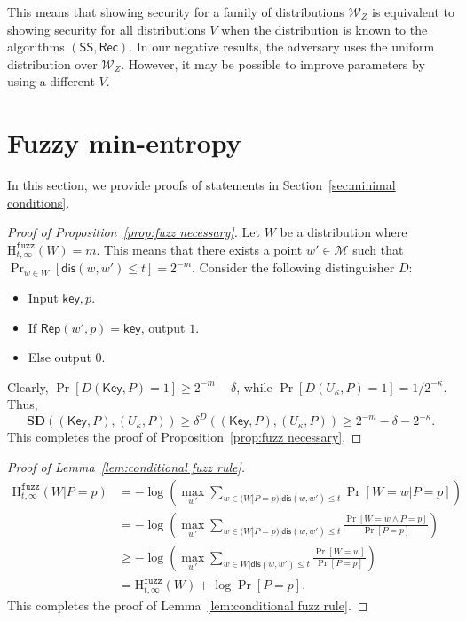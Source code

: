 \documentclass[11pt]{article}
\newcommand{\secref}[1]{\mbox{Section~\ref{#1}}}
\newcommand{\lemref}[1]{\mbox{Lemma~\ref{#1}}}
\newcommand{\propref}[1]{\mbox{Proposition~\ref{#1}}}
\newcommand{\class}[1]{{\ensuremath{\mathsf{#1}}}}
\newcommand{\key}{\ensuremath{\class{key}}\xspace}
\newcommand{\Key}{\ensuremath{\class{Key}}\xspace}
\newcommand{\rep}{\ensuremath{\class{Rep}}\xspace}
\newcommand{\sketch}{\ensuremath{\class{SS}}\xspace}
\newcommand{\rec}{\ensuremath{\class{Rec}}\xspace}
\newcommand{\dis}{\ensuremath{\mathsf{dis}}}
\newcommand{\Hfuzz}{\mathrm{H}^{\mathtt{fuzz}}_{t,\infty}}
\newcommand{\sd}{\ensuremath{\mathbf{SD}}}
\begin{document}
\noindent
This means that showing security for a family of distributions $\mathcal{W}_Z$ is equivalent to showing security for all distributions $V$ when the distribution is known to the algorithms $(\sketch, \rec)$.  In our negative results, the adversary uses the uniform distribution over $\mathcal{W}_Z$.  However, it may be possible to improve parameters by using a different $V$. 

\section{Fuzzy min-entropy}
\label{sec:proof fuzz necessary}
In this section, we provide proofs of statements in \secref{sec:minimal conditions}.  
\begin{proof}[Proof of \propref{prop:fuzz necessary}]
Let $W$ be a distribution where $\Hfuzz(W) = m$.  This means that there exists a point $w' \in \mathcal{M}$ such that $\Pr_{w\in W}[\dis (w, w')\leq t] = 2^{-m}$.  Consider the following distinguisher $D$:
\begin{itemize}
\item Input $\key, p$.
\item If $\rep(w', p) = \key$, output $1$.
\item Else output $0$.
\end{itemize}
Clearly, $\Pr[D(\Key, P) = 1]\geq 2^{-m} - \delta$, while $\Pr[D(U_\kappa, P)=1 ]= 1/2^{-\kappa}$.  Thus,
\[
\sd((\Key, P), (U_\kappa, P)) \ge \delta^D((\Key, P), (U_\kappa, P))\geq 2^{-m} -\delta -2^{-\kappa}.
\]
This completes the proof of \propref{prop:fuzz necessary}.
\end{proof}
\begin{proof}[Proof of \lemref{lem:conditional fuzz rule}]
\begin{align*}
\Hfuzz(W | P=p) &= -\log \left(\max_{w'}  \sum_{w\in (W |P=p) | \dis(w, w')\le t} \Pr[W=w | P=p] \right)\\
 &= -\log \left(\max_{w'}  \sum_{w\in (W |P=p) | \dis(w, w')\le t} \frac{\Pr[W=w \wedge P=p]}{\Pr[P=p]} \right)\\
 &\ge -\log \left(\max_{w'}  \sum_{w\in W| \dis(w, w')\le t} \frac{\Pr[W=w]}{\Pr[P=p]} \right)\\
 &= \Hfuzz(W) + \log \Pr[P=p].
\end{align*}
This completes the proof of \lemref{lem:conditional fuzz rule}.
\end{proof}
\end{document}
